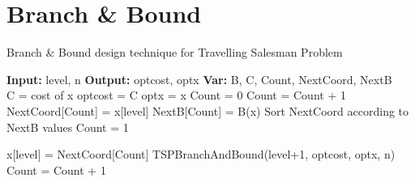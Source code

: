 \documentclass[12pt]{article}
\begin{document}
\section{Branch \& Bound}
\begin{algorithm}
  \caption{Branch \& Bound design technique for Travelling Salesman Problem}
  \begin{algorithmic}[1]
  
    \State \textbf{Input:} level, n
    \State \textbf{Output:} optcost, optx 
    \State \textbf{Var:} B, C, Count, NextCoord, NextB 
    \\
    
        \State C = cost of x
            \State optcost = C
            \State optx = x
        \EndIf
    \Else
        \State Count = 0
                \State Count = Count + 1
                \State NextCoord[Count] = x[level]
                \State NextB[Count] = B(x)
            \EndIf
        \EndFor
        \State Sort NextCoord according to NextB values
        \State Count = 1
        
        \While {$Count \leq n-level$ and NextB[count] \textless optcost]}
            
                \State x[level] = NextCoord[Count]
                \State TSPBranchAndBound(level+1, optcost, optx, n)
            \EndIf
            \State Count = Count + 1
        \EndWhile
        
        
    \EndIf
    \EndProcedure
  \end{algorithmic}
\end{algorithm}
\end{document}
